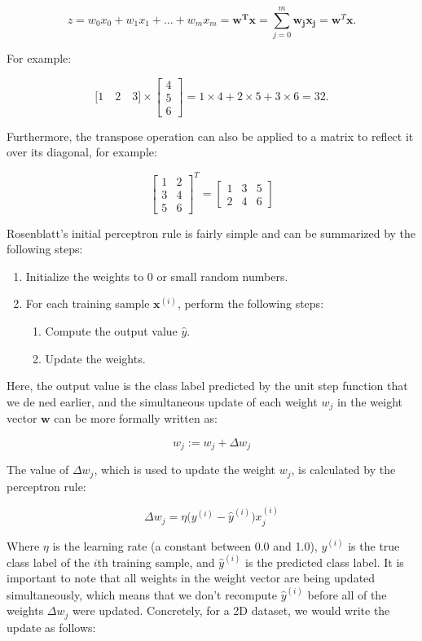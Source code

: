 \documentclass{report}
\begin{document}
\[
z  = w_0 x_0 + w_1 x_1 + \dots + w_m x_m = \mathbf{w^T x} = \sum_{j=0}^{m} \mathbf{w_j} \mathbf{x_j} = \mathbf{w}^T \mathbf{x}.
\]

For example:

\[
\big[1 \quad 2 \quad 3 \big] \times \begin{bmatrix}
    4  \\
    5  \\
    6
\end{bmatrix} = 1 \times 4 + 2 \times 5 + 3 \times 6 = 32.
\]

Furthermore, the transpose operation can also be applied to a matrix to
reflect it over its diagonal, for example:

\[
 \begin{bmatrix}
    1 & 2  \\
    3 & 4  \\
    5 & 6
\end{bmatrix}^T =  \begin{bmatrix}
    1 & 3 & 5 \\
    2 & 4 & 6
\end{bmatrix}
\]

Rosenblatt's initial perceptron rule is fairly simple and can be summarized by the following steps:

\begin{enumerate}  
\item Initialize the weights to 0 or small random numbers.
\item For each training sample $\mathbf{x}^{(i)}$, perform the following steps:
\begin{enumerate}  
\item Compute the output value $\hat{y}$.
\item Update the weights.
\end{enumerate}
\end{enumerate}

Here, the output value is the class label predicted by the unit step function that we de ned earlier, and the simultaneous update of each weight $w_j$ in the weight vector $\mathbf{w}$ can be more formally written as:

\[
w_j := w_j + \Delta w_j
\]

The value of $\Delta w_j$, which is used to update the weight $w_j$, is calculated by the perceptron rule:

\[
\Delta w_j = \eta \bigg( y^{(i)} - \hat{y}^{(i)} \bigg)x_{j}^{(i)}
\]

Where $\eta$ is the learning rate (a constant between 0.0 and 1.0), $y^{(i)}$ is the true class label of the $i$th training sample, and $\hat{y}^{(i)}$ is the predicted class label. It is important to note that all weights in the weight vector are being updated simultaneously, which means that we don't recompute $\hat{y}^{(i)}$ before all of the weights $\Delta w_j$ were updated. Concretely, for a 2D dataset, we would write the update as follows:
\end{document}
